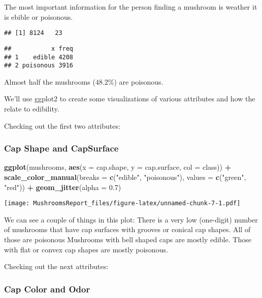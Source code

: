 \documentclass[]{article}
\newenvironment{Shaded}{\begin{snugshade}}{\end{snugshade}}
\newcommand{\KeywordTok}[1]{\textcolor[rgb]{0.13,0.29,0.53}{\textbf{#1}}}
\newcommand{\DataTypeTok}[1]{\textcolor[rgb]{0.13,0.29,0.53}{#1}}
\newcommand{\FloatTok}[1]{\textcolor[rgb]{0.00,0.00,0.81}{#1}}
\newcommand{\StringTok}[1]{\textcolor[rgb]{0.31,0.60,0.02}{#1}}
\newcommand{\OperatorTok}[1]{\textcolor[rgb]{0.81,0.36,0.00}{\textbf{#1}}}
\newcommand{\NormalTok}[1]{#1}
\begin{document}
The most important information for the person finding a mushroom is
weather it is ebible or poisonous.

\begin{verbatim}
## [1] 8124   23
\end{verbatim}

\begin{verbatim}
##           x freq
## 1    edible 4208
## 2 poisonous 3916
\end{verbatim}

Almost half the mushrooms (48.2\%) are poisonous.

We'll use ggplot2 to create some visualizations of various attributes
and how the relate to edibility.

Checking out the first two attributes:

\subsubsection{Cap Shape and CapSurface}\label{cap-shape-and-capsurface}

\begin{Shaded}
\begin{Highlighting}[]
\KeywordTok{ggplot}\NormalTok{(mushrooms, }\KeywordTok{aes}\NormalTok{(}\DataTypeTok{x =}\NormalTok{ cap.shape, }\DataTypeTok{y =}\NormalTok{ cap.surface, }\DataTypeTok{col =}\NormalTok{ class)) }\OperatorTok{+}\StringTok{ }
\StringTok{  }\KeywordTok{scale_color_manual}\NormalTok{(}\DataTypeTok{breaks =} \KeywordTok{c}\NormalTok{(}\StringTok{"edible"}\NormalTok{, }\StringTok{"poisonous"}\NormalTok{), }
                     \DataTypeTok{values =} \KeywordTok{c}\NormalTok{(}\StringTok{"green"}\NormalTok{, }\StringTok{"red"}\NormalTok{)) }\OperatorTok{+}
\StringTok{  }\KeywordTok{geom_jitter}\NormalTok{(}\DataTypeTok{alpha =} \FloatTok{0.7}\NormalTok{) }
\end{Highlighting}
\end{Shaded}

\texttt{[image: MushroomsReport\_files/figure-latex/unnamed-chunk-7-1.pdf]}

We can see a couple of things in this plot: There is a very low
(one-digit) number of mushrooms that have cap surfaces with grooves or
conical cap shapes. All of those are poisonous Mushrooms with bell
shaped caps are mostly edible. Those with flat or convex cap shapes are
mostly poisonous.

Checking out the next attributes:

\subsubsection{Cap Color and Odor}\label{cap-color-and-odor}
\end{document}
